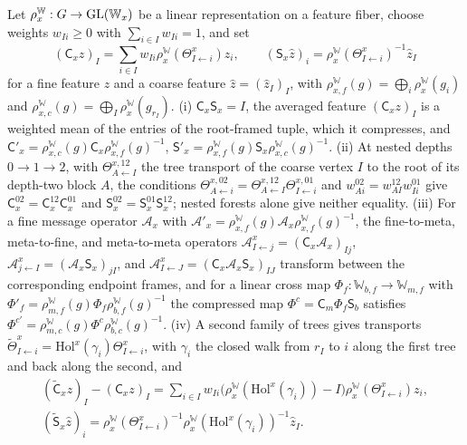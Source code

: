 Let $\rho^{\mathbb W}_x:G\to\mathrm{GL}(\mathbb W_x)$ be a linear representation on a feature fiber, choose weights $w_{Ii}\geq0$ with
$\sum_{i\in I}w_{Ii}=1$, and set
\begin{equation}
(\mathsf C_xz)_I=\sum_{i\in I}w_{Ii}\rho^{\mathbb W}_x(\Theta^x_{I\leftarrow i})z_i,
\qquad
(\mathsf S_x\hat z)_i=\rho^{\mathbb W}_x(\Theta^x_{I\leftarrow i})^{-1}\hat z_I
\label{eq:rg-linear-cross-scale-maps}
\end{equation}
for a fine feature $z$ and a coarse feature $\hat z=(\hat z_I)_I$, with
$\rho^{\mathbb W}_{x,f}(g)=\bigoplus_i\rho^{\mathbb W}_x(g_i)$ and $\rho^{\mathbb W}_{x,c}(g)=\bigoplus_I\rho^{\mathbb W}_x(g_{r_I})$. (i)
$\mathsf C_x\mathsf S_x=I$, the averaged feature $(\mathsf C_xz)_I$ is a weighted mean of the entries of the
root-framed tuple, which it compresses, and
$\mathsf C'_x=\rho^{\mathbb W}_{x,c}(g)\mathsf C_x\rho^{\mathbb W}_{x,f}(g)^{-1}$,
$\mathsf S'_x=\rho^{\mathbb W}_{x,f}(g)\mathsf S_x\rho^{\mathbb W}_{x,c}(g)^{-1}$. (ii) At nested depths $0\to1\to2$, with
$\Theta^{x,12}_{A\leftarrow I}$ the tree transport of the coarse vertex $I$ to the root of its depth-two
block $A$, the conditions
$\Theta^{x,02}_{A\leftarrow i}=\Theta^{x,12}_{A\leftarrow I}\Theta^{x,01}_{I\leftarrow i}$ and
$w^{02}_{Ai}=w^{12}_{AI}w^{01}_{Ii}$ give $\mathsf C^{02}_x=\mathsf C^{12}_x\mathsf C^{01}_x$ and
$\mathsf S^{02}_x=\mathsf S^{01}_x\mathsf S^{12}_x$; nested forests alone give neither equality. (iii) For a
fine message operator $\mathcal A_x$ with $\mathcal A'_x=\rho^{\mathbb W}_{x,f}(g)\mathcal A_x\rho^{\mathbb W}_{x,f}(g)^{-1}$, the
fine-to-meta, meta-to-fine, and meta-to-meta operators
$\mathcal A^x_{I\leftarrow j}=(\mathsf C_x\mathcal A_x)_{Ij}$,
$\mathcal A^x_{j\leftarrow I}=(\mathcal A_x\mathsf S_x)_{jI}$, and
$\mathcal A^x_{I\leftarrow J}=(\mathsf C_x\mathcal A_x\mathsf S_x)_{IJ}$ transform between the corresponding
endpoint frames, and for a linear cross map $\Phi_f:\mathbb W_{b,f}\to \mathbb W_{m,f}$ with
$\Phi'_f=\rho^{\mathbb W}_{m,f}(g)\Phi_f\rho^{\mathbb W}_{b,f}(g)^{-1}$ the compressed map $\Phi^c=\mathsf C_m\Phi_f\mathsf S_b$
satisfies $\Phi^{c\prime}=\rho^{\mathbb W}_{m,c}(g)\Phi^c\rho^{\mathbb W}_{b,c}(g)^{-1}$. (iv) A second family of trees gives
transports $\widetilde\Theta^x_{I\leftarrow i}=\mathrm{Hol}^x(\gamma_i)\Theta^x_{I\leftarrow i}$, with
$\gamma_i$ the closed walk from $r_I$ to $i$ along the first tree and back along the second, and
\begin{equation}
\begin{gathered}
(\widetilde{\mathsf C}_xz)_I-(\mathsf C_xz)_I
=\sum_{i\in I}w_{Ii}\bigl(\rho^{\mathbb W}_x(\mathrm{Hol}^x(\gamma_i))-I\bigr)\rho^{\mathbb W}_x(\Theta^x_{I\leftarrow i})z_i,\\
(\widetilde{\mathsf S}_x\hat z)_i=\rho^{\mathbb W}_x(\Theta^x_{I\leftarrow i})^{-1}\rho^{\mathbb W}_x(\mathrm{Hol}^x(\gamma_i))^{-1}\hat z_I.
\end{gathered}
\label{eq:rg-linear-cross-scale-tree-change}
\end{equation}
